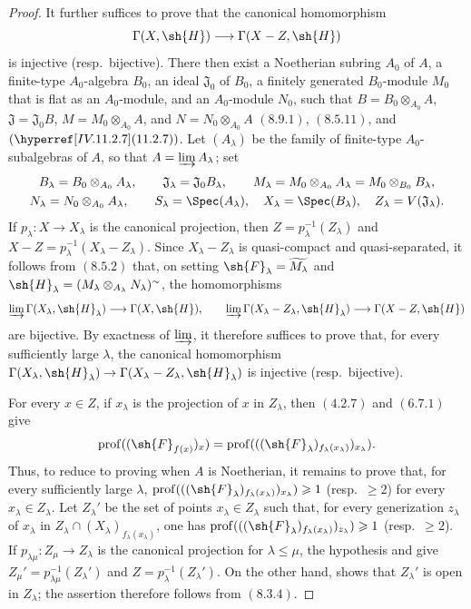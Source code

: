 \begin{proof}
It further suffices to prove that the canonical homomorphism
\[
  \Gamma(X,\sh{H})\longrightarrow\Gamma(X-Z,\sh{H})
\]
is injective (resp.\ bijective). There then exist a Noetherian subring $A_0$ of $A$, a finite-type $A_0$-algebra $B_0$, an ideal $\mathfrak{J}_0$ of $B_0$, a finitely generated $B_0$-module $M_0$ that is flat as an $A_0$-module, and an $A_0$-module $N_0$, such that
$B=B_0\otimes_{A_0}A$, $\mathfrak{J}=\mathfrak{J}_0B$, $M=M_0\otimes_{A_0}A$, and $N=N_0\otimes_{A_0}A$ $(8.9.1)$, $(8.5.11)$, and $(\sref{IV.11.2.7})$. Let $(A_\lambda)$ be the family of finite-type $A_0$-subalgebras of $A$, so that $A=\varinjlim A_\lambda$; set
\[
\begin{gathered}
  B_\lambda=B_0\otimes_{A_0}A_\lambda,\qquad
  \mathfrak{J}_\lambda=\mathfrak{J}_0B_\lambda,\qquad
  M_\lambda=M_0\otimes_{A_0}A_\lambda=M_0\otimes_{B_0}B_\lambda,\\
  N_\lambda=N_0\otimes_{A_0}A_\lambda,\qquad
  S_\lambda=\Spec(A_\lambda),\quad X_\lambda=\Spec(B_\lambda),\quad
  Z_\lambda=V(\mathfrak{J}_\lambda).
\end{gathered}
\]
If $p_\lambda:X\to X_\lambda$ is the canonical projection, then $Z=p_\lambda^{-1}(Z_\lambda)$ and $X-Z=p_\lambda^{-1}(X_\lambda-Z_\lambda)$. Since $X_\lambda-Z_\lambda$ is quasi-compact and quasi-separated, it follows from $(8.5.2)$ that, on setting $\sh{F}_\lambda=\widetilde{M_\lambda}$ and $\sh{H}_\lambda=(M_\lambda\otimes_{A_\lambda}N_\lambda)^\sim$, the homomorphisms
\[
  \varinjlim\Gamma(X_\lambda,\sh{H}_\lambda)\longrightarrow\Gamma(X,\sh{H}),
  \qquad
  \varinjlim\Gamma(X_\lambda-Z_\lambda,\sh{H}_\lambda)\longrightarrow\Gamma(X-Z,\sh{H})
\]
are bijective. By exactness of $\varinjlim$, it therefore suffices to prove that, for every sufficiently large $\lambda$, the canonical homomorphism $\Gamma(X_\lambda,\sh{H}_\lambda)\to\Gamma(X_\lambda-Z_\lambda,\sh{H}_\lambda)$ is injective (resp.\ bijective).

For every $x\in Z$, if $x_\lambda$ is the projection of $x$ in $Z_\lambda$, then $(4.2.7)$ and $(6.7.1)$ give
\[
  \operatorname{prof}((\sh{F}_{f(x)})_x)
  =\operatorname{prof}(((\sh{F}_\lambda)_{f_\lambda(x_\lambda)})_{x_\lambda}).
\]
Thus, to reduce to proving  when $A$ is Noetherian, it remains to prove that, for every sufficiently large $\lambda$, $\operatorname{prof}(((\sh{F}_\lambda)_{f_\lambda(x_\lambda)})_{x_\lambda})\geqslant1$ (resp.\ $\geqslant2$) for every $x_\lambda\in Z_\lambda$. Let $Z_\lambda'$ be the set of points $x_\lambda\in Z_\lambda$ such that, for every generization $z_\lambda$ of $x_\lambda$ in $Z_\lambda\cap(X_\lambda)_{f_\lambda(x_\lambda)}$, one has $\operatorname{prof}(((\sh{F}_\lambda)_{f_\lambda(x_\lambda)})_{z_\lambda})\geqslant1$ (resp.\ $\geqslant2$). If $p_{\lambda\mu}:Z_\mu\to Z_\lambda$ is the canonical projection for $\lambda\leqslant\mu$, the hypothesis and  give $Z_\mu'=p_{\lambda\mu}^{-1}(Z_\lambda')$ and $Z=p_\lambda^{-1}(Z_\lambda')$. On the other hand,  shows that $Z_\lambda'$ is open in $Z_\lambda$; the assertion therefore follows from $(8.3.4)$.


\end{proof}
